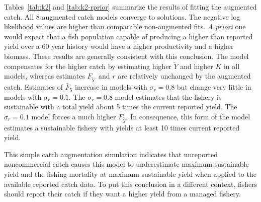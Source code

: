 \documentclass[12pt,letterpaper]{article}
\newcommand\MSY{\widetilde{Y}}
\newcommand\Fmsy{F_{\MSY}}
\begin{document}
Tables~\ref{tab:k2} and \ref{tab:k2-rprior} summarize the results of
fitting the augmented catch.
All 8 augmented catch models converge to solutions. The negative
log likelihood values are higher than comparable non-augmented fits.
{\it A priori} one would expect that a fish population capable
of producing a higher than reported yield over a 60 year history
would have a higher productivity and a higher biomass. These results
are generally consistent with this conclusion. 
The model compensates for the higher catch by estimating higher
$\MSY$ and higher $K$ in all models, 
whereas estimates $\Fmsy$\ and $r$ are relatively unchanged by the
augmented catch.
Estimates of $\bar{F}_5$ increase in models with $\sigma_r=0.8$ but
change very little in models with $\sigma_r=0.1$.
The $\sigma_r=0.8$ model estimates that the fishery is sustainable
with a total yield about 5 times the current reported yield.
The $\sigma_r=0.1$ model forces a much higher $\Fmsy$. In consequence,
this form of the model estimates a sustainable fishery with yields at
least 10 times current reported yield. 

This simple catch augmentation simulation indicates that unreported
noncommercial catch causes this model to underestimate maximum
sustainable yield and the fishing mortality at maximum sustainable
yield when applied to the available reported catch data. To put this
conclusion in a different context, fishers should report their catch
if they want a higher yield from a managed fishery.
\end{document}
